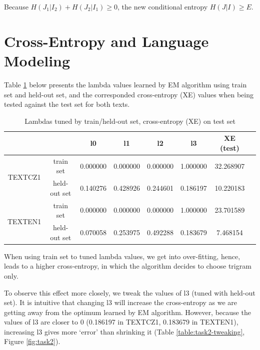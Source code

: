 \documentclass{article}
\begin{document}
Because $H(J_1|I_2)+H(J_2|I_1)\ge 0$, the new conditional entropy $H(J|I)\ge E$.

\section{Cross-Entropy and Language Modeling}

Table \ref{table:task2-lambdas} below presents the lambda values learned by EM algorithm using train set and held-out set, and the corresponded cross-entropy (XE) values when being tested against the test set for both texts.

\begin{table}[h]
    \centering
    \begin{tabular}{|c|c|c|c|c|c|c|c|} 
        \hline
        & & l0 & l1 & l2 & l3 & XE (test) \\
        \hline
        \multirow{2}{5em}{TEXTCZ1} & train set & 0.000000 & 0.000000 & 0.000000 & 1.000000 & 32.268907 \\
        \cline{2-7}
        & held-out set & 0.140276 & 0.428926 & 0.244601 & 0.186197 & 10.220183 \\
        \hline
        \multirow{2}{5em}{TEXTEN1} & train set & 0.000000 & 0.000000 & 0.000000 & 1.000000 & 23.701589 \\
        \cline{2-7}
        & held-out set & 0.070058 & 0.253975 & 0.492288 & 0.183679 & 7.468154 \\
        \hline
    \end{tabular}
    \caption{Lambdas tuned by train/held-out set, cross-entropy (XE) on test set}
    \label{table:task2-lambdas}
\end{table}

When using train set to tuned lambda values, we get into over-fitting, hence, leads to a higher cross-entropy, in which the algorithm decides to choose trigram only.

To observe this effect more closely, we tweak the values of l3 (tuned with held-out set). It is intuitive that changing l3 will increase the cross-entropy as we are getting away from the optimum learned by EM algorithm. However, because the values of l3 are closer to 0 (0.186197 in TEXTCZ1, 0.183679 in TEXTEN1), increasing l3 gives more `error' than shrinking it (Table \ref{table:task2-tweaking}, Figure \ref{fig:task2}).
\end{document}
